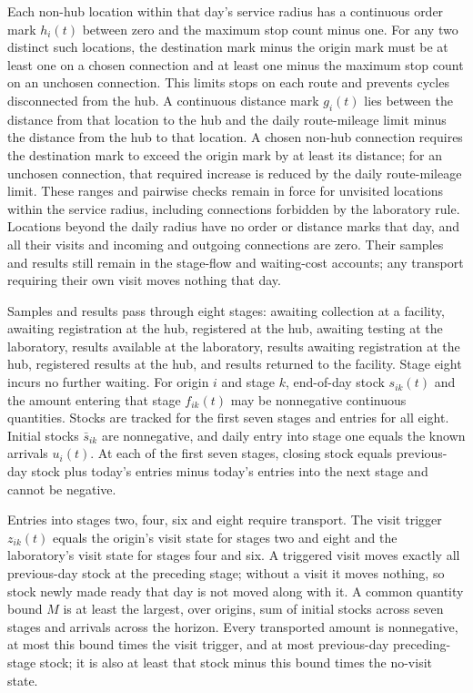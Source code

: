\documentclass[10pt]{article}
\begin{document}
Each non-hub location within that day's service radius has a continuous order mark $h_i(t)$ between zero and the maximum stop count minus one. For any two distinct such locations, the destination mark minus the origin mark must be at least one on a chosen connection and at least one minus the maximum stop count on an unchosen connection. This limits stops on each route and prevents cycles disconnected from the hub. A continuous distance mark $g_i(t)$ lies between the distance from that location to the hub and the daily route-mileage limit minus the distance from the hub to that location. A chosen non-hub connection requires the destination mark to exceed the origin mark by at least its distance; for an unchosen connection, that required increase is reduced by the daily route-mileage limit. These ranges and pairwise checks remain in force for unvisited locations within the service radius, including connections forbidden by the laboratory rule. Locations beyond the daily radius have no order or distance marks that day, and all their visits and incoming and outgoing connections are zero. Their samples and results still remain in the stage-flow and waiting-cost accounts; any transport requiring their own visit moves nothing that day.

Samples and results pass through eight stages: awaiting collection at a facility, awaiting registration at the hub, registered at the hub, awaiting testing at the laboratory, results available at the laboratory, results awaiting registration at the hub, registered results at the hub, and results returned to the facility. Stage eight incurs no further waiting. For origin $i$ and stage $k$, end-of-day stock $s_{ik}(t)$ and the amount entering that stage $f_{ik}(t)$ may be nonnegative continuous quantities. Stocks are tracked for the first seven stages and entries for all eight. Initial stocks $\bar s_{ik}$ are nonnegative, and daily entry into stage one equals the known arrivals $u_i(t)$. At each of the first seven stages, closing stock equals previous-day stock plus today's entries minus today's entries into the next stage and cannot be negative.

Entries into stages two, four, six and eight require transport. The visit trigger $z_{ik}(t)$ equals the origin's visit state for stages two and eight and the laboratory's visit state for stages four and six. A triggered visit moves exactly all previous-day stock at the preceding stage; without a visit it moves nothing, so stock newly made ready that day is not moved along with it. A common quantity bound $M$ is at least the largest, over origins, sum of initial stocks across seven stages and arrivals across the horizon. Every transported amount is nonnegative, at most this bound times the visit trigger, and at most previous-day preceding-stage stock; it is also at least that stock minus this bound times the no-visit state.
\end{document}
